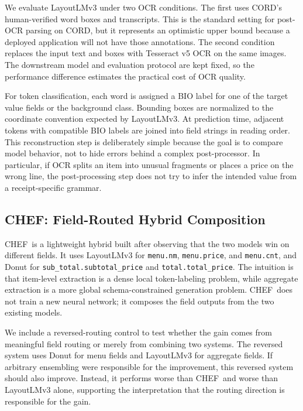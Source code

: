 \documentclass[9pt,twocolumn,twoside]{extarticle}
\newcommand{\cord}{\textsc{CORD}}
\newcommand{\chef}{\textsc{CHEF}}
\begin{document}
We evaluate LayoutLMv3 under two OCR conditions. The first uses \cord's human-verified word boxes and transcripts. This is the standard setting for post-OCR parsing on \cord, but it represents an optimistic upper bound because a deployed application will not have those annotations. The second condition replaces the input text and boxes with Tesseract v5 OCR on the same images. The downstream model and evaluation protocol are kept fixed, so the performance difference estimates the practical cost of OCR quality.

For token classification, each word is assigned a BIO label for one of the target value fields or the background class. Bounding boxes are normalized to the coordinate convention expected by LayoutLMv3. At prediction time, adjacent tokens with compatible BIO labels are joined into field strings in reading order. This reconstruction step is deliberately simple because the goal is to compare model behavior, not to hide errors behind a complex post-processor. In particular, if OCR splits an item into unusual fragments or places a price on the wrong line, the post-processing step does not try to infer the intended value from a receipt-specific grammar.

\subsection{\chef: Field-Routed Hybrid Composition}
\label{sec:chef}

\chef\ is a lightweight hybrid built after observing that the two models win on different fields. It uses LayoutLMv3 for \texttt{menu.nm}, \texttt{menu.price}, and \texttt{menu.cnt}, and Donut for \texttt{sub\_total.subtotal\_price} and \texttt{total.total\_price}. The intuition is that item-level extraction is a dense local token-labeling problem, while aggregate extraction is a more global schema-constrained generation problem. \chef\ does not train a new neural network; it composes the field outputs from the two existing models.

We include a reversed-routing control to test whether the gain comes from meaningful field routing or merely from combining two systems. The reversed system uses Donut for menu fields and LayoutLMv3 for aggregate fields. If arbitrary ensembling were responsible for the improvement, this reversed system should also improve. Instead, it performs worse than \chef\ and worse than LayoutLMv3 alone, supporting the interpretation that the routing direction is responsible for the gain.
\end{document}
